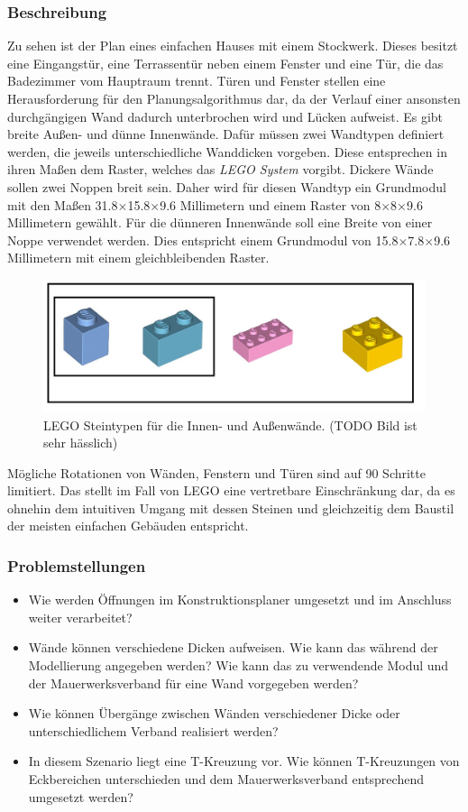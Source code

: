\subsubsection*{Beschreibung}
Zu sehen ist der Plan eines einfachen Hauses mit einem Stockwerk.
Dieses besitzt eine Eingangstür, eine Terrassentür neben einem Fenster und eine Tür, die das Badezimmer vom Hauptraum trennt.
Türen und Fenster stellen eine Herausforderung für den Planungsalgorithmus dar, da der Verlauf einer ansonsten durchgängigen Wand dadurch unterbrochen wird und Lücken aufweist.
Es gibt breite Außen- und dünne Innenwände.
Dafür müssen zwei Wandtypen definiert werden, die jeweils unterschiedliche Wanddicken vorgeben.
Diese entsprechen in ihren Maßen dem Raster, welches das \textit{LEGO System} vorgibt.
Dickere Wände sollen zwei Noppen breit sein.
Daher wird für diesen Wandtyp ein Grundmodul mit den Maßen 31.8$\times$15.8$\times$9.6 Millimetern und einem Raster von 8$\times$8$\times$9.6 Millimetern gewählt.
Für die dünneren Innenwände soll eine Breite von einer Noppe verwendet werden.
Dies entspricht einem Grundmodul von 15.8$\times$7.8$\times$9.6 Millimetern mit einem gleichbleibenden Raster.
\begin{figure}[!ht]
  \centering
  \includegraphics[width=0.6\columnwidth]{fig/scenario1_lego_set.png}
  \caption{LEGO Steintypen für die Innen- und Außenwände. (TODO Bild ist sehr hässlich)}\label{fig:scenarios:Scenario1 Lego Set}
\end{figure}
Mögliche Rotationen von Wänden, Fenstern und Türen sind auf 90\textdegree{} Schritte limitiert.
Das stellt im Fall von LEGO eine vertretbare Einschränkung dar, da es ohnehin dem intuitiven Umgang mit dessen Steinen und gleichzeitig dem Baustil der meisten einfachen Gebäuden entspricht.

\subsubsection*{Problemstellungen}
\begin{itemize}
  \item Wie werden Öffnungen im Konstruktionsplaner umgesetzt und im Anschluss weiter verarbeitet?
  \item Wände können verschiedene Dicken aufweisen. 
  Wie kann das während der Modellierung angegeben werden? 
  Wie kann das zu verwendende Modul und der Mauerwerksverband für eine Wand vorgegeben werden?
  \item Wie können Übergänge zwischen Wänden verschiedener Dicke oder unterschiedlichem Verband realisiert werden?
  \item In diesem Szenario liegt eine T-Kreuzung vor. 
  Wie können T-Kreuzungen von Eckbereichen unterschieden und dem Mauerwerksverband entsprechend umgesetzt werden? 
\end{itemize}

